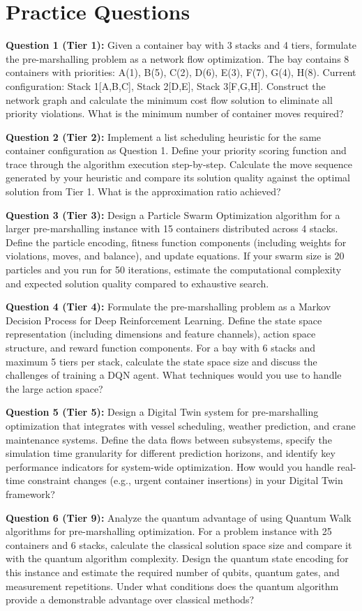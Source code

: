 \documentclass{article}
\begin{document}
\section{Practice Questions}

\textbf{Question 1 (Tier 1):} Given a container bay with 3 stacks and 4 tiers, formulate the pre-marshalling problem as a network flow optimization. The bay contains 8 containers with priorities: A(1), B(5), C(2), D(6), E(3), F(7), G(4), H(8). Current configuration: Stack 1[A,B,C], Stack 2[D,E], Stack 3[F,G,H]. Construct the network graph and calculate the minimum cost flow solution to eliminate all priority violations. What is the minimum number of container moves required?

\textbf{Question 2 (Tier 2):} Implement a list scheduling heuristic for the same container configuration as Question 1. Define your priority scoring function and trace through the algorithm execution step-by-step. Calculate the move sequence generated by your heuristic and compare its solution quality against the optimal solution from Tier 1. What is the approximation ratio achieved?

\textbf{Question 3 (Tier 3):} Design a Particle Swarm Optimization algorithm for a larger pre-marshalling instance with 15 containers distributed across 4 stacks. Define the particle encoding, fitness function components (including weights for violations, moves, and balance), and update equations. If your swarm size is 20 particles and you run for 50 iterations, estimate the computational complexity and expected solution quality compared to exhaustive search.

\textbf{Question 4 (Tier 4):} Formulate the pre-marshalling problem as a Markov Decision Process for Deep Reinforcement Learning. Define the state space representation (including dimensions and feature channels), action space structure, and reward function components. For a bay with 6 stacks and maximum 5 tiers per stack, calculate the state space size and discuss the challenges of training a DQN agent. What techniques would you use to handle the large action space?

\textbf{Question 5 (Tier 5):} Design a Digital Twin system for pre-marshalling optimization that integrates with vessel scheduling, weather prediction, and crane maintenance systems. Define the data flows between subsystems, specify the simulation time granularity for different prediction horizons, and identify key performance indicators for system-wide optimization. How would you handle real-time constraint changes (e.g., urgent container insertions) in your Digital Twin framework?

\textbf{Question 6 (Tier 9):} Analyze the quantum advantage of using Quantum Walk algorithms for pre-marshalling optimization. For a problem instance with 25 containers and 6 stacks, calculate the classical solution space size and compare it with the quantum algorithm complexity. Design the quantum state encoding for this instance and estimate the required number of qubits, quantum gates, and measurement repetitions. Under what conditions does the quantum algorithm provide a demonstrable advantage over classical methods?
\end{document}
